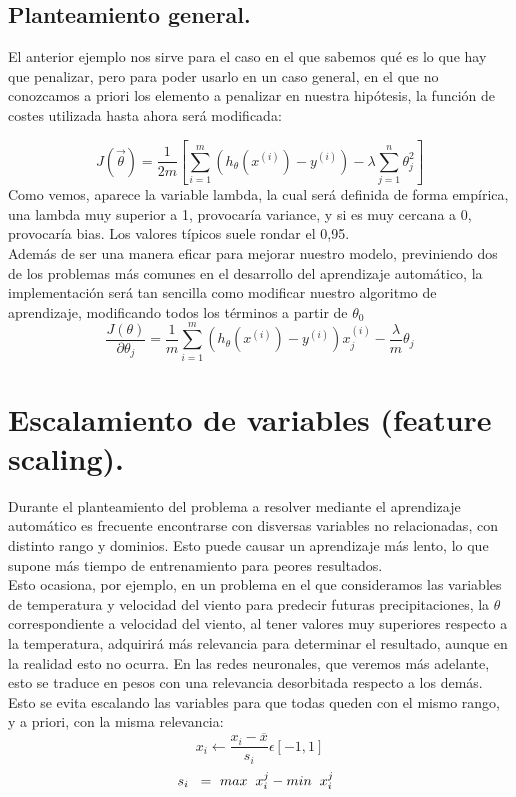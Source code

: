 \documentclass[a4paper,10pt]{article}
\begin{document}
\subsection{Planteamiento general.}
\noindent
El anterior ejemplo nos sirve para el caso en el que sabemos qué es lo que hay que penalizar, pero para poder usarlo en un caso general, en el que no conozcamos a priori los elemento a penalizar en nuestra hipótesis, la función de costes utilizada hasta ahora será modificada:

\[
J(\vec{\theta})=\frac{1}{2m}\left[\sum_{i=1}^{m} \left(h_\theta (x^{(i)})-y^{(i)}\right)-\lambda \sum_{j=1}^{n}\theta_{j}^2\right]
\]
Como vemos, aparece la variable lambda, la cual será definida de forma empírica, una lambda muy superior a 1, provocaría variance, y si es muy cercana a 0, provocaría bias. Los valores típicos suele rondar el 0,95.\\
Además de ser una manera eficar para mejorar nuestro modelo, previniendo dos de los problemas más comunes en el desarrollo del aprendizaje automático, la implementación será tan sencilla como modificar nuestro algoritmo de aprendizaje, modificando todos los términos a partir de $\theta_0$ \\
\[
\frac{J(\theta)}{\partial\theta_j} = \frac{1}{m} \sum_{i=1}^{m} \left(h_\theta (x^{(i)})-y^{(i)}\right) x_{j}^{(i)}-\frac{\lambda}{m} \theta_j 
\]
\section{Escalamiento de variables (feature scaling).}
\noindent
Durante el planteamiento del problema a resolver mediante el aprendizaje automático es frecuente encontrarse con disversas variables no relacionadas, con distinto rango y dominios. Esto puede causar un aprendizaje más lento, lo que supone más tiempo de entrenamiento para peores resultados. \\
Esto ocasiona, por ejemplo, en un problema en el que consideramos las variables de temperatura y velocidad del viento para predecir futuras precipitaciones, la $\theta$ correspondiente a  velocidad del viento, al tener valores muy superiores respecto a la temperatura, adquirirá más relevancia para determinar el resultado, aunque en la realidad esto no ocurra. En las redes neuronales, que veremos más adelante, esto se traduce en pesos con una relevancia desorbitada respecto a los demás.\\
Esto se evita escalando las variables para que todas queden con el mismo rango, y a priori, con la misma relevancia:
\[
x_i \longleftarrow \frac{x_i - \overline{x}}{s_i} \epsilon [-1,1]
\]
\hspace{0.20cm}
\[
s_i \hspace{0.20cm} = \  max\hspace{0.20cm}x_{i}^j -min\hspace{0.20cm}x_{i}^j \hspace{0.20cm}
\]
\newpage
\end{document}

